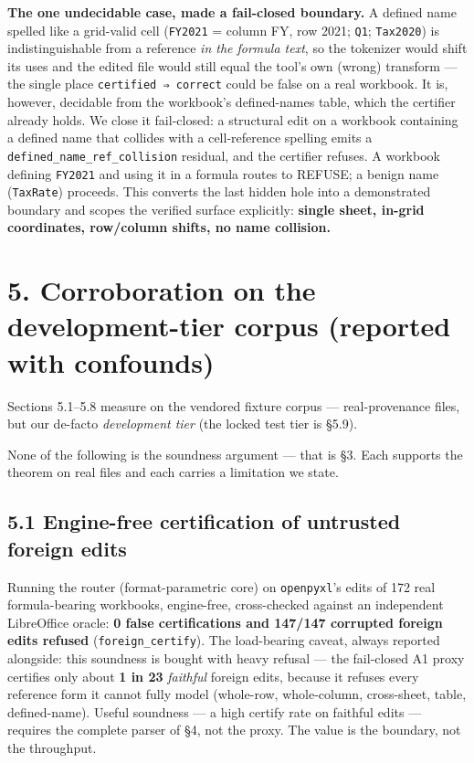 \documentclass[
  11pt,
]{article}
\begin{document}
\textbf{The one undecidable case, made a fail-closed boundary.} A
defined name spelled like a grid-valid cell (\texttt{FY2021} = column
FY, row 2021; \texttt{Q1}; \texttt{Tax2020}) is indistinguishable from a
reference \emph{in the formula text}, so the tokenizer would shift its
uses and the edited file would still equal the tool's own (wrong)
transform --- the single place \texttt{certified\ ⇒\ correct} could be
false on a real workbook. It is, however, decidable from the workbook's
defined-names table, which the certifier already holds. We close it
fail-closed: a structural edit on a workbook containing a defined name
that collides with a cell-reference spelling emits a
\texttt{defined\_name\_ref\_collision} residual, and the certifier
refuses. A workbook defining \texttt{FY2021} and using it in a formula
routes to REFUSE; a benign name (\texttt{TaxRate}) proceeds. This
converts the last hidden hole into a demonstrated boundary and scopes
the verified surface explicitly: \textbf{single sheet, in-grid
coordinates, row/column shifts, no name collision.}

\section{5. Corroboration on the development-tier corpus (reported with
confounds)}\label{corroboration-on-the-development-tier-corpus-reported-with-confounds}

Sections 5.1--5.8 measure on the vendored fixture corpus ---
real-provenance files, but our de-facto \emph{development tier} (the
locked test tier is §5.9).

None of the following is the soundness argument --- that is §3. Each
supports the theorem on real files and each carries a limitation we
state.

\subsection{5.1 Engine-free certification of untrusted foreign
edits}\label{engine-free-certification-of-untrusted-foreign-edits}

Running the router (format-parametric core) on \texttt{openpyxl}'s edits
of 172 real formula-bearing workbooks, engine-free, cross-checked
against an independent LibreOffice oracle: \textbf{0 false
certifications and 147/147 corrupted foreign edits refused}
(\texttt{foreign\_certify}). The load-bearing caveat, always reported
alongside: this soundness is bought with heavy refusal --- the
fail-closed A1 proxy certifies only about \textbf{1 in 23}
\emph{faithful} foreign edits, because it refuses every reference form
it cannot fully model (whole-row, whole-column, cross-sheet, table,
defined-name). Useful soundness --- a high certify rate on faithful
edits --- requires the complete parser of §4, not the proxy. The value
is the boundary, not the throughput.
\end{document}
